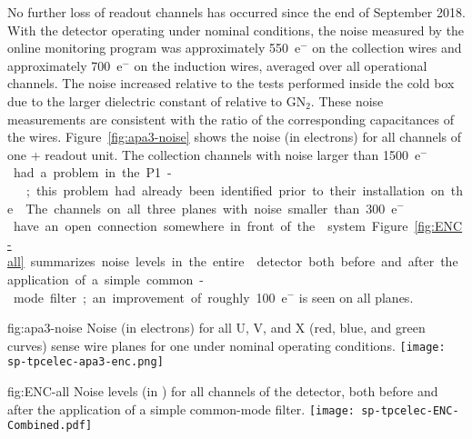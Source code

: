 No %
further loss of readout channels has occurred since 
the end of September 2018.
With the detector operating under nominal %
conditions, the noise
measured by the online monitoring program was approximately 550~e$^-$ 
on the collection wires and approximately 700~e$^-$ on the induction
wires, averaged over all operational channels. The noise increased %
relative to the tests performed inside the cold box due to the 
larger dielectric constant of \lntwo 
{} relative to GN$_2$. 
These noise measurements  %
are consistent with the 
ratio of the corresponding capacitances of the  wires. 
Figure~\ref{fig:apa3-noise} 
shows the noise (in electrons) for all channels of one %
+ readout unit. %
The collection channels with noise larger than \SI{1500}{e$^-$} had a problem %
 in the P1- 
;  %
this problem had already
been identified %
prior to their
installation on the . The channels on all three planes 
with noise smaller than \SI{300}{e$^-$} have an open connection somewhere in 
front of the  system. Figure~\ref{fig:ENC-all} summarizes
noise levels in the entire  detector both before and
after the application of a simple common-mode filter; an improvement
of roughly 100~e$^-$ is seen on all planes. %

\begin{dunefigure}
{fig:apa3-noise}
{Noise (in electrons) for all U, V, and X (red, blue, and green curves) sense 
wire planes for one   %
under nominal operating 
conditions.}
\texttt{[image: sp-tpcelec-apa3-enc.png]}
\end{dunefigure}

\begin{dunefigure}
{fig:ENC-all}
{Noise levels (in ) for all channels of the  detector, both
before and after the application of a simple common-mode filter.}
\texttt{[image: sp-tpcelec-ENC-Combined.pdf]}
\end{dunefigure}

